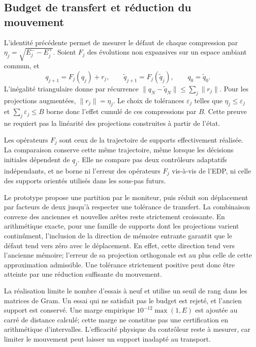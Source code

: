 \documentclass[11pt,a4paper]{article}
\begin{document}
\subsection{Budget de transfert et réduction du mouvement}
L'identité précédente permet de mesurer le défaut de chaque compression
par $\eta_j=\sqrt{E_j^--E_j^+}$. Soient $F_j$ des évolutions
non expansives sur un espace ambiant commun, et
\[
 q_{j+1}=F_j(q_j)+r_j,\qquad
 \widetilde q_{j+1}=F_j(\widetilde q_j),\qquad
 q_0=\widetilde q_0.
\]
L'inégalité triangulaire donne par récurrence
$\|q_N-\widetilde q_N\|\leq\sum_j\|r_j\|$.
Pour les projections augmentées, $\|r_j\|=\eta_j$.
Le choix de tolérances $\varepsilon_j$ telles que
$\eta_j\leq\varepsilon_j$ et $\sum_j\varepsilon_j\leq B$
borne donc l'effet cumulé de ces compressions par $B$.
Cette preuve ne requiert pas la linéarité des projections construites
à partir de l'état.

Les opérateurs $F_j$ sont ceux de la trajectoire de supports effectivement
réalisée. La comparaison conserve cette même trajectoire, même lorsque
les décisions initiales dépendent de $q_j$. Elle ne compare pas deux
contrôleurs adaptatifs indépendants, et ne borne ni l'erreur des
opérateurs $F_j$ vis-à-vis de l'EDP, ni celle des supports orientés
utilisés dans les sous-pas futurs.

Le prototype propose une partition par le moniteur, puis réduit son
déplacement par facteurs de deux jusqu'à respecter une tolérance
de transfert. La combinaison convexe des anciennes et nouvelles arêtes
reste strictement croissante. En arithmétique exacte, pour une famille
de supports dont les projections varient continûment, l'inclusion de
la direction de mémoire entrante garantit que le défaut tend vers zéro
avec le déplacement. En effet, cette direction tend vers l'ancienne
mémoire; l'erreur de sa projection orthogonale est au plus celle de
cette approximation admissible. Une tolérance strictement positive
peut donc être atteinte par une réduction suffisante du mouvement.

La réalisation limite le nombre d'essais à neuf et utilise un seuil de
rang dans les matrices de Gram. Un essai qui ne satisfait pas le budget
est rejeté, et l'ancien support est conservé. Une marge empirique
$10^{-12}\max(1,E)$ est ajoutée au carré de distance calculé;
cette marge ne constitue pas une certification en arithmétique
d'intervalles. L'efficacité physique du contrôleur reste à mesurer,
car limiter le mouvement peut laisser un support inadapté au transport.
\end{document}
